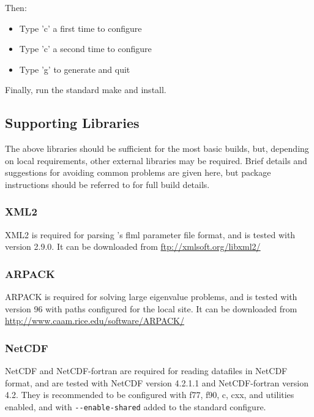 Then:

\begin{itemize}
  \item Type 'c' a first time to configure
  \item Type 'c' a second time to configure
  \item Type 'g' to generate and quit
\end{itemize}

Finally, run the standard make and install.

\subsection{Supporting Libraries}
\label{sec:required_libraries_supporting}

The above libraries should be sufficient for the most basic \fluidity builds,
but, depending on local requirements, other external libraries may be required.
Brief details and suggestions for avoiding common problems are given here, but
package instructions should be referred to for full build details.

\subsubsection{XML2}
\label{sec:required_libraries_supporting_xml2}

XML2 is required for parsing \fluidity's flml parameter file format, and is
tested with version 2.9.0. It can be downloaded from \url{ftp://xmlsoft.org/libxml2/}

\subsubsection{ARPACK}
\label{sec:required_libraries_supporting_arpack}

ARPACK is required for solving large eigenvalue problems, and is tested with
version 96 with paths configured for the local site. It can be downloaded from
\url{http://www.caam.rice.edu/software/ARPACK/}

\subsubsection{NetCDF}
\label{sec:required_libraries_supporting_netcdf}

NetCDF and NetCDF-fortran are required for reading datafiles in NetCDF format,
and are tested with NetCDF version 4.2.1.1 and NetCDF-fortran version 4.2. They
is recommended to be configured with f77, f90, c, cxx, and utilities enabled,
and with \lstinline[language=bash]+--enable-shared+ added to the standard
configure. 

